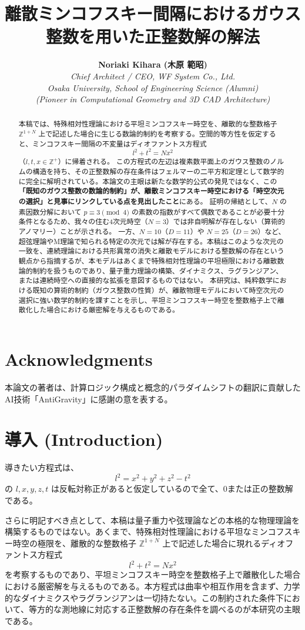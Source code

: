 \documentclass[a4paper,11pt]{ltjsarticle}
\title{離散ミンコフスキー間隔におけるガウス整数を用いた正整数解の解法}
\author{
    \textbf{Noriaki Kihara (木原 範昭)} \\
    \textit{Chief Architect / CEO, WF System Co., Ltd.} \\
    \textit{Osaka University, School of Engineering Science (Alumni)} \\
    \textit{(Pioneer in Computational Geometry and 3D CAD Architecture)}
}
\date{}
\begin{document}
\maketitle

\section*{Acknowledgments}
本論文の著者は、計算ロジック構成と概念的パラダイムシフトの翻訳に貢献したAI技術「AntiGravity」に感謝の意を表する。

\begin{abstract}
本稿では、特殊相対性理論における平坦ミンコフスキー時空を、離散的な整数格子 $\mathbb{Z}^{1+N}$ 上で記述した場合に生じる数論的制約を考察する。空間的等方性を仮定すると、ミンコフスキー間隔の不変量はディオファントス方程式
\[ l^2 + t^2 = N x^2 \]
（$l, t, x \in \mathbb{Z}^+$）に帰着される。
この方程式の左辺は複素数平面上のガウス整数のノルムの構造を持ち、その正整数解の存在条件はフェルマーの二平方和定理として数学的に完全に解明されている。本論文の主眼は新たな数学的公式の発見ではなく、この\textbf{「既知のガウス整数の数論的制約」が、離散ミンコフスキー時空における「時空次元の選択」と見事にリンクしている点を見出したこと}にある。
証明の帰結として、$N$ の素因数分解において $p \equiv 3 \pmod{4}$ の素数の指数がすべて偶数であることが必要十分条件となるため、我々の住む4次元時空（$N=3$）では非自明解が存在しない（算術的アノマリー）ことが示される。
一方、$N=10$（$D=11$）や $N=25$（$D=26$）など、超弦理論やM理論で知られる特定の次元では解が存在する。本稿はこのような次元の一致を、連続理論における共形異常の消失と離散モデルにおける整数解の存在という観点から指摘するが、本モデルはあくまで特殊相対性理論の平坦極限における離散数論的制約を扱うものであり、量子重力理論の構築、ダイナミクス、ラグランジアン、または連続時空への直接的な拡張を意図するものではない。
本研究は、純粋数学における既知の算術的制約（ガウス整数の性質）が、離散物理モデルにおいて時空次元の選択に強い数学的制約を課すことを示し、平坦ミンコフスキー時空を整数格子上で離散化した場合における厳密解を与えるものである。
\end{abstract}

\section{導入 (Introduction)}
導きたい方程式は、
\[ l^2 = x^2 + y^2 + z^2 - t^2 \]
の \( l, x, y, z, t \) は反転対称正があると仮定しているので全て、0または正の整数解である。

さらに明記すべき点として、本稿は量子重力や弦理論などの本格的な物理理論を構築するものではない。あくまで、特殊相対性理論における平坦なミンコフスキー時空の極限を、離散的な整数格子 $\mathbb{Z}^{1+N}$ 上で記述した場合に現れるディオファントス方程式
\[ l^2 + t^2 = N x^2 \]
を考察するものであり、平坦ミンコフスキー時空を整数格子上で離散化した場合における厳密解を与えるものである。本方程式は曲率や相互作用を含まず、力学的なダイナミクスやラグランジアンは一切持たない。この制約された条件下において、等方的な測地線に対応する正整数解の存在条件を調べるのが本研究の主眼である。
\end{document}
